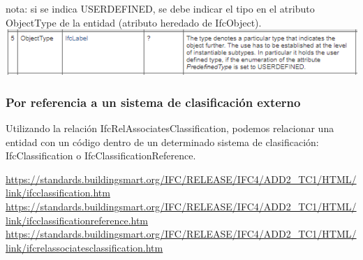 \documentclass[spanish,10pt,a4paper,final,oneside]{article}
\begin{document}
nota: si se indica USERDEFINED, se debe indicar el tipo en el atributo ObjectType de la entidad (atributo heredado de IfcObject).
\\ \includegraphics[scale=1]{atributo ObjectType}

\subsubsection{Por referencia a un sistema de clasificación externo}
Utilizando la relación IfcRelAssociatesClassification, podemos relacionar una entidad con un código dentro de un determinado sistema de clasificación: IfcClassification o IfcClassificationReference.

\begin{footnotesize}
\url{https://standards.buildingsmart.org/IFC/RELEASE/IFC4/ADD2_TC1/HTML/link/ifcclassification.htm}
\\ \url{https://standards.buildingsmart.org/IFC/RELEASE/IFC4/ADD2_TC1/HTML/link/ifcclassificationreference.htm}
\\ \url{https://standards.buildingsmart.org/IFC/RELEASE/IFC4/ADD2_TC1/HTML/link/ifcrelassociatesclassification.htm}
\end{footnotesize}
\end{document}
